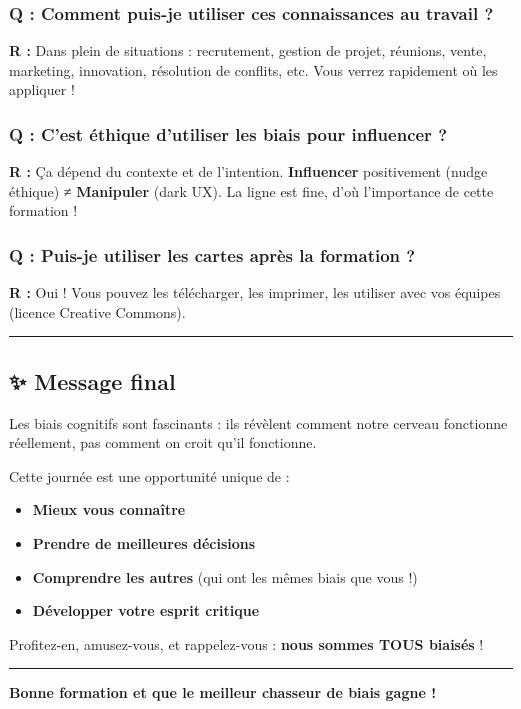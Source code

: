 \documentclass[
]{article}
\providecommand{\tightlist}{%
  \setlength{\itemsep}{0pt}\setlength{\parskip}{0pt}}
\begin{document}
\subsubsection{\texorpdfstring{\textbf{Q : Comment puis-je utiliser ces
connaissances au travail
?}}{Q : Comment puis-je utiliser ces connaissances au travail ?}}\label{q-comment-puis-je-utiliser-ces-connaissances-au-travail}

\textbf{R :} Dans plein de situations : recrutement, gestion de projet,
réunions, vente, marketing, innovation, résolution de conflits, etc.
Vous verrez rapidement où les appliquer !

\subsubsection{\texorpdfstring{\textbf{Q : C'est éthique d'utiliser les
biais pour influencer
?}}{Q : C'est éthique d'utiliser les biais pour influencer ?}}\label{q-cest-uxe9thique-dutiliser-les-biais-pour-influencer}

\textbf{R :} Ça dépend du contexte et de l'intention.
\textbf{Influencer} positivement (nudge éthique) ≠ \textbf{Manipuler}
(dark UX). La ligne est fine, d'où l'importance de cette formation !

\subsubsection{\texorpdfstring{\textbf{Q : Puis-je utiliser les cartes
après la formation
?}}{Q : Puis-je utiliser les cartes après la formation ?}}\label{q-puis-je-utiliser-les-cartes-apruxe8s-la-formation}

\textbf{R :} Oui ! Vous pouvez les télécharger, les imprimer, les
utiliser avec vos équipes (licence Creative Commons).

\begin{center}\rule{0.5\linewidth}{0.5pt}\end{center}

\subsection{✨ Message final}\label{message-final}

Les biais cognitifs sont fascinants : ils révèlent comment notre cerveau
fonctionne réellement, pas comment on croit qu'il fonctionne.

Cette journée est une opportunité unique de :

\begin{itemize}
\tightlist
\item
  \textbf{Mieux vous connaître}
\item
  \textbf{Prendre de meilleures décisions}
\item
  \textbf{Comprendre les autres} (qui ont les mêmes biais que vous !)
\item
  \textbf{Développer votre esprit critique}
\end{itemize}

Profitez-en, amusez-vous, et rappelez-vous : \textbf{nous sommes TOUS
biaisés} ! 🧠

\begin{center}\rule{0.5\linewidth}{0.5pt}\end{center}

\textbf{Bonne formation et que le meilleur chasseur de biais gagne ! 🎯}
\end{document}
